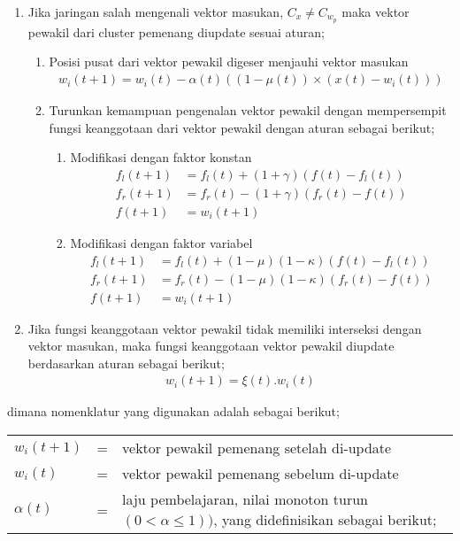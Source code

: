 \begin{enumerate}
  \item Jika jaringan salah mengenali vektor masukan, $C_x \neq C_{w_p}$ maka
  vektor pewakil dari cluster pemenang diupdate sesuai aturan;
  \begin{enumerate}
    \item Posisi pusat dari vektor pewakil digeser menjauhi vektor masukan
  	\begin{align}
  	w_i(t+1) = w_i(t) - \alpha(t) \left((1-\mu(t))\times(x(t) - w_i(t))  \right)
  	\end{align}
  	\item Turunkan kemampuan pengenalan vektor pewakil dengan mempersempit fungsi
  	keanggotaan dari vektor pewakil dengan aturan sebagai berikut;
  	\begin{enumerate}
  	  \item Modifikasi dengan faktor konstan
  	  \begin{align}
  	  f_l(t+1) &= f_l(t) + (1+\gamma) (f(t) - f_l(t)) \\
  	  f_r(t+1) &= f_r(t) - (1+\gamma) (f_r(t) - f(t)) \nonumber \\
  	  f(t+1)   &= w_i(t+1) \nonumber 
  	  \end{align}
  	  
  	  \item Modifikasi dengan faktor variabel
	  \begin{align}
  	  f_l(t+1) &= f_l(t) + (1 - \mu)(1-\kappa)(f(t) - f_l(t)) \\
  	  f_r(t+1) &= f_r(t) - (1 - \mu)(1-\kappa)(f_r(t) - f(t)) \nonumber \\
  	  f(t+1)   &= w_i(t+1) \nonumber
  	  \end{align}  	  
  	\end{enumerate}
  \end{enumerate}
  
  \item Jika fungsi keanggotaan vektor pewakil tidak memiliki interseksi dengan
  vektor masukan, maka fungsi keanggotaan vektor pewakil diupdate berdasarkan aturan
  sebagai berikut;
  \begin{align}
  w_i(t+1) = \xi(t).w_i(t)
  \end{align}
\end{enumerate}

\noindent dimana nomenklatur yang digunakan adalah sebagai berikut;

\begin{tabular}{llp{}}
$w_{i}(t+1)$ &=& vektor pewakil pemenang setelah di-update  \\
$w_{i}(t)$ 	 &=& vektor pewakil pemenang sebelum di-update \\
$\alpha(t)$  &=& laju pembelajaran, nilai monoton turun $(0 < \alpha \le 1))$,
 yang didefinisikan sebagai berikut;
\end{tabular}

